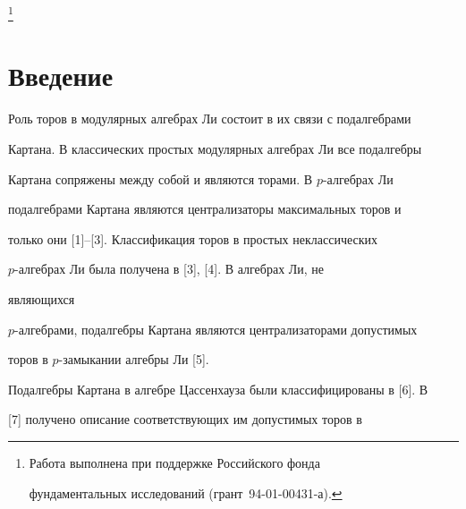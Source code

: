 \thanks{Работа выполнена при поддержке Российского фонда


фундаментальных исследований (грант \No\,94-01-00431-а).}


\date{}







\pagestyle{plain} %













\maketitle













\section*{Введение}


Роль торов в модулярных алгебрах Ли состоит в их связи с подалгебрами


Картана. В классических простых модулярных алгебрах Ли все подалгебры


Картана сопряжены между собой и являются торами. В $p$-алгебрах Ли


подалгебрами Картана являются централизаторы максимальных торов и


только они [1]--[3]. Классификация торов в простых неклассических


$p$-алгебрах Ли была получена в [3], [4]. В алгебрах Ли, не


являющихся


$p$-алгебрами, подалгебры Картана являются централизаторами допустимых


торов в $p$-замыкании алгебры Ли [5].





Подалгебры Картана в алгебре Цассенхауза были классифицированы в [6]. В


[7] получено описание соответствующих им допустимых торов в


